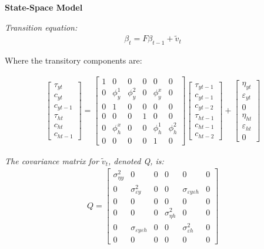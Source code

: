 \documentclass[fleqn]{article}
\begin{document}
\begin{outline}[enumerate]
\textbf{State-Space Model}

\textit{Transition equation:}
\begin{align}
\beta_t = F\beta_{t-1} + \tilde{v}_t
\end{align}

Where the transitory components are:

\begin{align}
\begin{bmatrix}
\tau_{yt}	\\
c_{yt}		\\
c_{yt-1}		\\
\tau_{ht}	\\
c_{ht}		\\
c_{ht-1}		
\end{bmatrix}
=
\begin{bmatrix}
1	& 0	& 0	& 0	& 0	& 0	\\
0	& \phi^1_y	& \phi^2_y	& 0	& \phi^x_y	& 0	\\
0	& 1	& 0	& 0 & 0 & 0  \\
0	& 0	& 0	& 1	& 0	& 0 \\
0	& \phi^x_h	& 0	& 0 &\phi^1_h	& \phi^2_h	\\
0	& 0	& 0	& 0 & 1 & 0
\end{bmatrix}
\begin{bmatrix}
\tau_{yt-1}	\\
c_{yt-1}		\\
c_{yt-2}		\\
\tau_{ht-1}	\\
c_{ht-1}		\\
c_{ht-2}		
\end{bmatrix}
+
\begin{bmatrix}
\eta_{yt}	\\
\varepsilon_{yt}		\\
0	\\
\eta_{ht}	\\
\varepsilon_{ht}		\\
0	
\end{bmatrix}
\end{align}

\textit{The covariance matrix for $\tilde{v}_t$, denoted Q, is: }
\begin{align}
Q = 
\begin{bmatrix}
\sigma^2_{\eta y}	& 0	 &0 & 0	& 0	& 0	\\
0	& \sigma^2_{\varepsilon y}	& 0	& 0	& \sigma_{\varepsilon y \varepsilon h}	& 0	\\
0	&	0	& 0 & 0 & 0 & 0	\\
0	& 0	& 0	& \sigma^2_{\eta h}	& 0	& 0	\\
0	& \sigma_{\varepsilon y \varepsilon h}	& 0	& 0	& \sigma^2_{\varepsilon h}		& 0	\\
0	&0	& 0	& 0
	& 0	& 0
\end{bmatrix}
\end{align}


\end{outline}
\end{document}
